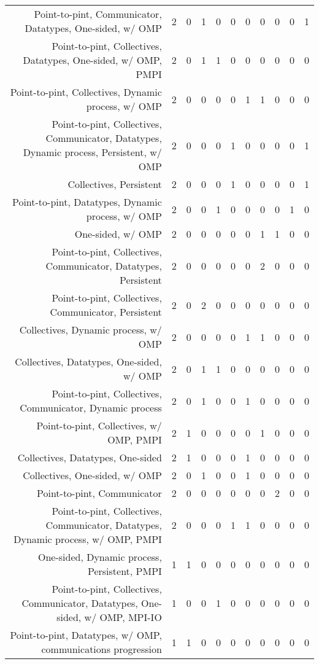 {\begin{landscape}
\begin{longtable}[htb]{r|c|c|c|c|c|c|c|c|c|c}
{Point-to-pint, Communicator, Datatypes, One-sided, w/ OMP} & 2 & 0 & 1 & 0 & 0 & 0 & 0 & 0 & 0 & 1 \\%
{Point-to-pint, Collectives, Datatypes, One-sided, w/ OMP, PMPI} & 2 & 0 & 1 & 1 & 0 & 0 & 0 & 0 & 0 & 0 \\%
{Point-to-pint, Collectives, Dynamic process, w/ OMP} & 2 & 0 & 0 & 0 & 0 & 1 & 1 & 0 & 0 & 0 \\%
{Point-to-pint, Collectives, Communicator, Datatypes, Dynamic process, Persistent, w/ OMP} & 2 & 0 & 0 & 0 & 1 & 0 & 0 & 0 & 0 & 1 \\%
{Collectives, Persistent} & 2 & 0 & 0 & 0 & 1 & 0 & 0 & 0 & 0 & 1 \\%
{Point-to-pint, Datatypes, Dynamic process, w/ OMP} & 2 & 0 & 0 & 1 & 0 & 0 & 0 & 0 & 1 & 0 \\%
{One-sided, w/ OMP} & 2 & 0 & 0 & 0 & 0 & 0 & 1 & 1 & 0 & 0 \\%
{Point-to-pint, Collectives, Communicator, Datatypes, Persistent} & 2 & 0 & 0 & 0 & 0 & 0 & 2 & 0 & 0 & 0 \\%
{Point-to-pint, Collectives, Communicator, Persistent} & 2 & 0 & 2 & 0 & 0 & 0 & 0 & 0 & 0 & 0 \\%
{Collectives, Dynamic process, w/ OMP} & 2 & 0 & 0 & 0 & 0 & 1 & 1 & 0 & 0 & 0 \\%
{Collectives, Datatypes, One-sided, w/ OMP} & 2 & 0 & 1 & 1 & 0 & 0 & 0 & 0 & 0 & 0 \\%
{Point-to-pint, Collectives, Communicator, Dynamic process} & 2 & 0 & 1 & 0 & 0 & 1 & 0 & 0 & 0 & 0 \\%
{Point-to-pint, Collectives, w/ OMP, PMPI} & 2 & 1 & 0 & 0 & 0 & 0 & 1 & 0 & 0 & 0 \\%
{Collectives, Datatypes, One-sided} & 2 & 1 & 0 & 0 & 0 & 1 & 0 & 0 & 0 & 0 \\%
{Collectives, One-sided, w/ OMP} & 2 & 0 & 1 & 0 & 0 & 1 & 0 & 0 & 0 & 0 \\%
{Point-to-pint, Communicator} & 2 & 0 & 0 & 0 & 0 & 0 & 0 & 2 & 0 & 0 \\%
{Point-to-pint, Collectives, Communicator, Datatypes, Dynamic process, w/ OMP, PMPI} & 2 & 0 & 0 & 0 & 1 & 1 & 0 & 0 & 0 & 0 \\%
{One-sided, Dynamic process, Persistent, PMPI} & 1 & 1 & 0 & 0 & 0 & 0 & 0 & 0 & 0 & 0 \\%
{Point-to-pint, Collectives, Communicator, Datatypes, One-sided, w/ OMP, MPI-IO} & 1 & 0 & 0 & 1 & 0 & 0 & 0 & 0 & 0 & 0 \\%
{Point-to-pint, Datatypes, w/ OMP, communications progression} & 1 & 1 & 0 & 0 & 0 & 0 & 0 & 0 & 0 & 0 \\%

\end{longtable}
\end{landscape}}
